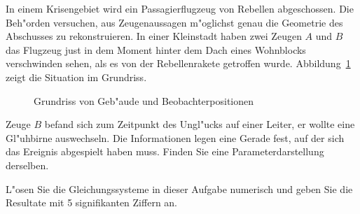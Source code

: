 In einem Krisengebiet wird ein Passagierflugzeug von Rebellen abgeschossen.
Die Beh"orden versuchen, aus Zeugenaussagen m"oglichst genau die
Geometrie des Abschusses zu rekonstruieren.
In einer Kleinstadt haben zwei Zeugen $A$ und $B$ das Flugzeug just in
dem Moment hinter dem Dach eines Wohnblocks verschwinden sehen, 
als es von der Rebellenrakete getroffen wurde.
Abbildung~\ref{30000042:grundriss} zeigt die Situation im Grundriss.
\begin{figure}[h]
\centering
{}
\caption{Grundriss von Geb"aude und Beobachterpositionen
\label{30000042:grundriss}}
\end{figure}
Zeuge $B$ befand sich zum Zeitpunkt des Ungl"ucks auf einer Leiter,
er wollte eine Gl"uhbirne auswechseln. 
Die Informationen legen eine Gerade fest, auf der sich das Ereignis
abgespielt haben muss.
Finden Sie eine Parameterdarstellung derselben.

\begin{hinweis}
L"osen Sie die Gleichungssysteme in dieser Aufgabe numerisch und geben Sie
die Resultate mit 5 signifikanten Ziffern an.
\end{hinweis}

